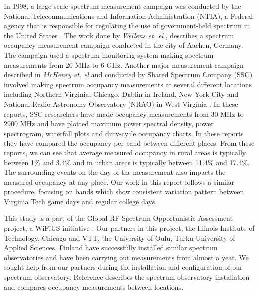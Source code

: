 \documentclass[12pt,sts]{report}
\begin{document}
In 1998, a large scale spectrum measurement campaign was conducted by the National Telecommunications and Information Administration (NTIA), a Federal agency that is responsible for regulating the use of government-held spectrum in the United States \cite{750342}. The work done by \textit{Wellens et. el} \cite{4549835}, describes a spectrum occupancy measurement campaign conducted in the city of Aachen, Germany. The campaign used a spectrum monitoring system making spectrum measurements from 20 MHz to 6 GHz. %
Another major measurement campaign described in \textit{McHenry et. el} \cite{McHenry:2006:CSO:1234388.1234389} and conducted by Shared Spectrum Company (SSC) involved making spectrum occupancy measurements at several different locations including Northern Virginia, Chicago, Dublin in Ireland, New York City and National Radio Astronomy Observatory (NRAO) in West Virginia \cite{SSCSpecReportIreland} \cite{SSCSpecReportChicago} \cite{SSCSpecReportRiverbendPark} \cite{SSCSpecReportNYC} \cite{SSCSpecReportNRAO}. In these reports, SSC researchers have made occupancy measurements from 30 MHz to 2900 MHz and have plotted maximum power spectral density, power spectrogram, waterfall plots and duty-cycle occupancy charts. In these reports they have compared the occupancy per-band between different places. From these reports, we can see that average measured occupancy in rural areas is typically between 1\% and 3.4\% and in urban areas is typically between 11.4\% and 17.4\%. %
The surrounding events on the day of the measurement also impacts the measured occupancy at any place. Our work in this report follows a similar procedure, focusing on bands which show consistent variation pattern between Virginia Tech game days and regular college days. 

This study is a part of the Global RF Spectrum Opportunistic Assessment project, a WiFiUS initiative \cite{HAGER_GRANT}. Our partners in this project, the Illinois Institute of Technology, Chicago and VTT, the University of Oulu, Turku University of Applied Sciences, Finland have successfully installed similar spectrum observatories and have been carrying out measurements from almost a year. We sought help from our partners during the installation and configuration of our spectrum observatory. Reference \cite{6849666} describes the spectrum observatory installation and compares occupancy measurements between locations.
\end{document}
